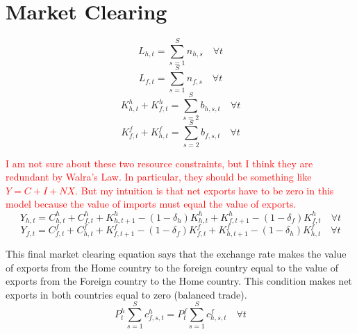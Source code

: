 \documentclass[letterpaper,12pt]{article}
\theoremstyle{definition}
\begin{document}
\section{Market Clearing}\label{SecLgOpenMC}

  \begin{equation}\label{EqLgOpenMC_Lh}
    L_{h,t} = \sum_{s=1}^S n_{h,s} \quad\forall t
  \end{equation}
  \begin{equation}\label{EqLgOpenMC_Lf}
    L_{f,t} = \sum_{s=1}^S n_{f,s} \quad\forall t
  \end{equation}
  \begin{equation}\label{EqLgOpenMC_Kh}
    K^h_{h,t} + K^h_{f,t} = \sum_{s=2}^S b_{h,s,t} \quad\forall t
  \end{equation}
  \begin{equation}\label{EqLgOpenMC_Kf}
    K^f_{f,t} + K^f_{h,t} = \sum_{s=2}^S b_{f,s,t} \quad\forall t
  \end{equation}

  \textcolor{red}{I am not sure about these two resource constraints, but I think they are redundant by Walra's Law. In particular, they should be something like $Y = C + I + NX$. But my intuition is that net exports have to be zero in this model because the value of imports must equal the value of exports.}
  \begin{equation}\label{EqLgOpenMC_Yh}
    Y_{h,t} = C^h_{h,t} + C^h_{f,t} + K^h_{h,t+1} - (1 - \delta_h)K^h_{h,t} + K^h_{f,t+1}- (1 - \delta_f)K^h_{f,t}\quad\forall t
  \end{equation}
  \begin{equation}\label{EqLgOpenMC_Yf}
    Y_{f,t} = C^f_{f,t} + C^f_{h,t} + K^f_{f,t+1} - (1 - \delta_f)K^f_{f,t} + K^f_{h,t+1}- (1 - \delta_h)K^f_{h,t} \quad\forall t
  \end{equation}

  This final market clearing equation says that the exchange rate makes the value of exports from the Home country to the foreign country equal to the value of exports from the Foreign country to the Home country. This condition makes net exports in both countries equal to zero (balanced trade).
  \begin{equation}\label{EqLgOpenMC_et}
    P^h_t\sum_{s=1}^S c^h_{f,s,t} = P^f_t\sum_{s=1}^S c^f_{h,s,t} \quad\forall t
  \end{equation}
\end{document}
